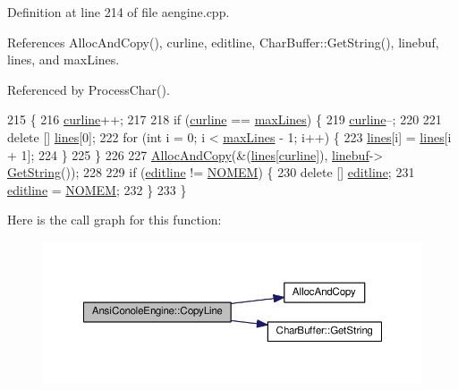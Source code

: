 Definition at line 214 of file aengine.\+cpp.



References Alloc\+And\+Copy(), curline, editline, Char\+Buffer\+::\+Get\+String(), linebuf, lines, and max\+Lines.



Referenced by Process\+Char().


\begin{DoxyCode}
215 \{
216     \hyperlink{classAnsiConoleEngine_ab029fc4a19c5fbd6f6b23c390af618b8}{curline}++;
217 
218     \textcolor{keywordflow}{if} (\hyperlink{classAnsiConoleEngine_ab029fc4a19c5fbd6f6b23c390af618b8}{curline} == \hyperlink{classAnsiConoleEngine_a3f94786b1610ac3f038d5115fd8047a3}{maxLines}) \{
219         \hyperlink{classAnsiConoleEngine_ab029fc4a19c5fbd6f6b23c390af618b8}{curline}--;
220 
221         \textcolor{keyword}{delete} [] \hyperlink{classAnsiConoleEngine_a624ec5321c326a68de340f9b77e84c2c}{lines}[0];
222         \textcolor{keywordflow}{for} (\textcolor{keywordtype}{int} i = 0; i < \hyperlink{classAnsiConoleEngine_a3f94786b1610ac3f038d5115fd8047a3}{maxLines} - 1; i++) \{
223             \hyperlink{classAnsiConoleEngine_a624ec5321c326a68de340f9b77e84c2c}{lines}[i] = \hyperlink{classAnsiConoleEngine_a624ec5321c326a68de340f9b77e84c2c}{lines}[i + 1];
224         \}
225     \}
226 
227     \hyperlink{clib_8h_a5bed05c70cb17e541fee570b5dc32e1a}{AllocAndCopy}(&(\hyperlink{classAnsiConoleEngine_a624ec5321c326a68de340f9b77e84c2c}{lines}[\hyperlink{classAnsiConoleEngine_ab029fc4a19c5fbd6f6b23c390af618b8}{curline}]), \hyperlink{classAnsiConoleEngine_a6bf88afa72a458e3687972f9e666cd86}{linebuf}->
      \hyperlink{classCharBuffer_a7dfd3feaaf80f318ba44efe15b1ec44b}{GetString}());
228 
229     \textcolor{keywordflow}{if} (\hyperlink{classAnsiConoleEngine_a465421c5488f2566d12717641a327017}{editline} != \hyperlink{platform_8h_a46ff2bfbf0d44b8466a2251d5bd5e6f8}{NOMEM}) \{
230         \textcolor{keyword}{delete} [] \hyperlink{classAnsiConoleEngine_a465421c5488f2566d12717641a327017}{editline};
231         \hyperlink{classAnsiConoleEngine_a465421c5488f2566d12717641a327017}{editline} = \hyperlink{platform_8h_a46ff2bfbf0d44b8466a2251d5bd5e6f8}{NOMEM};
232     \}
233 \}
\end{DoxyCode}


Here is the call graph for this function\+:
\nopagebreak
\begin{figure}[H]
\begin{center}
\leavevmode
\includegraphics[width=350pt]{df/d87/classAnsiConoleEngine_ae359fe52bf227c3db6edc42b8fc884f0_cgraph}
\end{center}
\end{figure}





